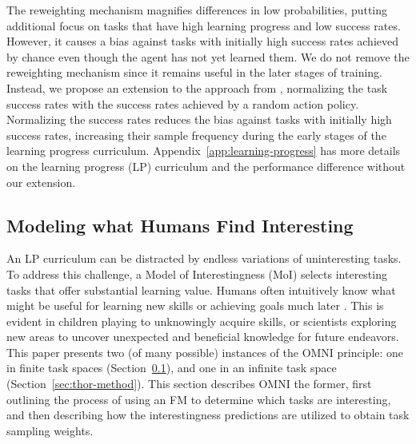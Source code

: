 \documentclass{article} %
\begin{document}
The reweighting mechanism magnifies differences in low probabilities, putting additional focus on tasks that have high learning progress and low success rates. However, it causes a bias against tasks with initially high success rates achieved by chance even though the agent has not yet learned them. We do not remove the reweighting mechanism since it remains useful in the later stages of training. Instead, we propose an extension to the approach from \citet{ingmar}, normalizing the task success rates with the success rates achieved by a random action policy. Normalizing the success rates reduces the bias against tasks with initially high success rates, increasing their sample frequency during the early stages of the learning progress curriculum. Appendix~\ref{app:learning-progress} has more details on the learning progress (LP) curriculum and the performance difference without our extension.

\subsection{Modeling what Humans Find Interesting}
\label{sec:moi}
An LP curriculum can be distracted by endless variations of uninteresting tasks. To address this challenge, a Model of Interestingness (MoI) selects interesting tasks that offer substantial learning value. Humans often intuitively know what might be useful for learning new skills or achieving goals much later \citep{stanley2015why}. This is evident in children playing to unknowingly acquire skills, or scientists exploring new areas to uncover unexpected and beneficial knowledge for future endeavors. This paper presents two (of many possible) instances of the OMNI principle: one in finite task spaces (Section~\ref{sec:moi}), and one in an infinite task space (Section~\ref{sec:thor-method}). This section describes OMNI the former, first outlining the process of using an FM to determine which tasks are interesting, and then describing how the interestingness predictions are utilized to obtain task sampling weights.
\end{document}
